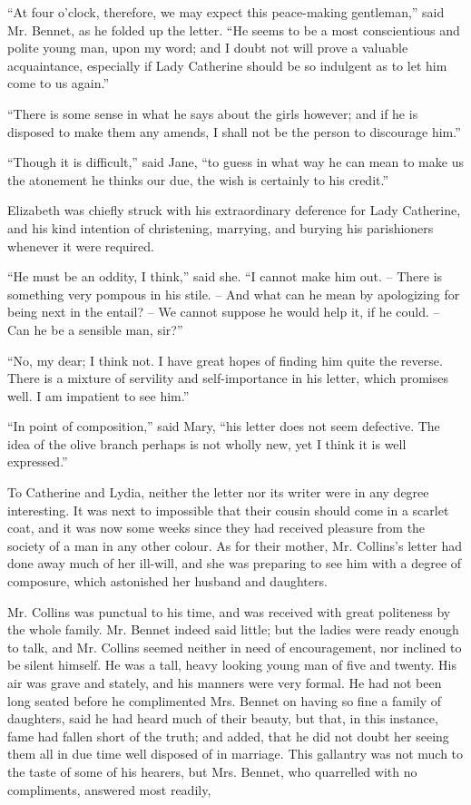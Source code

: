 “At four o’clock, therefore, we may expect this peace-making
gentleman,” said Mr. Bennet, as he folded up the
letter. “He seems to be a most conscientious and polite
young man, upon my word; and I doubt not will prove
a valuable acquaintance, especially if Lady Catherine
should be so indulgent as to let him come to us again.”

“There is some sense in what he says about the girls
however; and if he is disposed to make them any amends,
I shall not be the person to discourage him.”

“Though it is difficult,” said Jane, “to guess in what
way he can mean to make us the atonement he thinks
our due, the wish is certainly to his credit.”

Elizabeth was chiefly struck with his extraordinary
deference for Lady Catherine, and his kind intention of
christening, marrying, and burying his parishioners whenever
it were required.

“He must be an oddity, I think,” said she. “I cannot
make him out. -- There is something very pompous in his
stile. -- And what can he mean by apologizing for being
next in the entail? -- We cannot suppose he would help
it, if he could. -- Can he be a sensible man, sir?”

“No, my dear; I think not. I have great hopes of
finding him quite the reverse. There is a mixture of
servility and self-importance in his letter, which promises
well. I am impatient to see him.”

“In point of composition,” said Mary, “his letter does
not seem defective. The idea of the olive branch perhaps
is not wholly new, yet I think it is well expressed.”

To Catherine and Lydia, neither the letter nor its
writer were in any degree interesting. It was next to
impossible that their cousin should come in a scarlet coat,
and it was now some weeks since they had received
pleasure from the society of a man in any other colour.
As for their mother, Mr. Collins’s letter had done away
much of her ill-will, and she was preparing to see him
with a degree of composure, which astonished her husband
and daughters.

Mr. Collins was punctual to his time, and was received
with great politeness by the whole family. Mr. Bennet
indeed said little; but the ladies were ready enough to
talk, and Mr. Collins seemed neither in need of encouragement,
nor inclined to be silent himself. He was a tall, heavy
looking young man of five and twenty. His air was grave
and stately, and his manners were very formal. He had
not been long seated before he complimented Mrs. Bennet
on having so fine a family of daughters, said he had heard
much of their beauty, but that, in this instance, fame had
fallen short of the truth; and added, that he did not
doubt her seeing them all in due time well disposed of in
marriage. This gallantry was not much to the taste of
some of his hearers, but Mrs. Bennet, who quarrelled with
no compliments, answered most readily,


